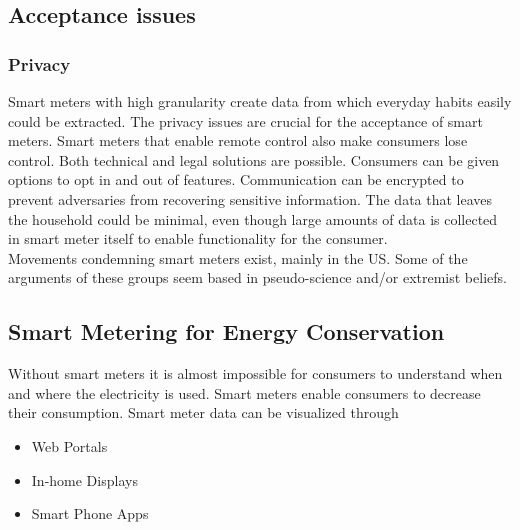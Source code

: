 \subsection{Acceptance issues}

\subsubsection{Privacy}
Smart meters with high granularity create data from which everyday habits easily could be extracted.
The privacy issues are crucial for the acceptance of smart meters.
Smart meters that enable remote control also make consumers lose control.
Both technical and legal solutions are possible.
Consumers can be given options to opt in and out of features.
Communication can be encrypted to prevent adversaries from recovering sensitive information.
The data that leaves the household could be minimal, even though large amounts of data is collected in smart meter itself to enable functionality for the consumer.\\

Movements condemning smart meters exist, mainly in the US.
Some of the arguments of these groups seem based in pseudo-science and/or extremist beliefs.

\subsection{Smart Metering for Energy Conservation}
Without smart meters it is almost impossible for consumers to understand when and where the electricity is used. Smart meters enable consumers to decrease their consumption.
Smart meter data can be visualized through
\begin{itemize}
    \item Web Portals
    \item In-home Displays
    \item Smart Phone Apps
\end{itemize}


